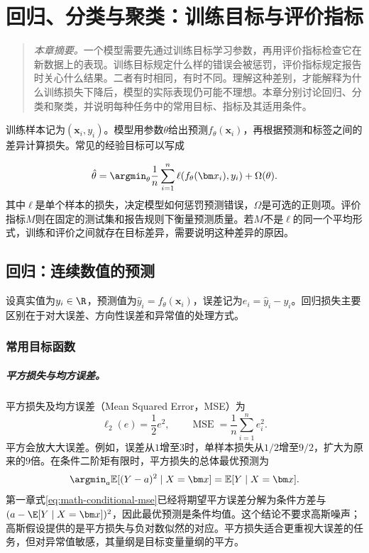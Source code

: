 \chapter{回归、分类与聚类：训练目标与评价指标}
\label{chap:objectives-metrics}
\begin{quote}\small
\textit{本章摘要。}一个模型需要先通过训练目标学习参数，再用评价指标检查它在新数据上的表现。训练目标规定什么样的错误会被惩罚，评价指标规定报告时关心什么结果。二者有时相同，有时不同。理解这种差别，才能解释为什么训练损失下降后，模型的实际表现仍可能不理想。本章分别讨论回归、分类和聚类，并说明每种任务中的常用目标、指标及其适用条件。
\end{quote}

训练样本记为$(\bm x_i,y_i)$。模型用参数$\theta$给出预测$f_\theta(\bm x_i)$，再根据预测和标签之间的差异计算损失。常见的经验目标可以写成

\begin{equation}
 \hat{\theta}=\argmin_{\theta}\frac1n\sum_{i=1}^n\ell(f_\theta(\bm x_i),y_i)+\Omega(\theta).
 \label{eq:pipeline-general-objective}
\end{equation}
其中$\ell$是单个样本的损失，决定模型如何惩罚预测错误，$\Omega$是可选的正则项。评价指标$M$则在固定的测试集和报告规则下衡量预测质量。若$M$不是$\ell$的同一个平均形式，训练和评价之间就存在目标差异，需要说明这种差异的原因。

\section{回归：连续数值的预测}
设真实值为$y_i\in\R$，预测值为$\hat y_i=f_\theta(\bm x_i)$，误差记为$e_i=\hat y_i-y_i$。回归损失主要区别在于对大误差、方向性误差和异常值的处理方式。

\subsection{常用目标函数}
\paragraph{平方损失与均方误差。}
平方损失及均方误差（Mean Squared Error，MSE）为
\begin{equation}
 \ell_2(e)=\frac12e^2,\qquad
 \operatorname{MSE}=\frac1n\sum_{i=1}^ne_i^2.
 \label{eq:regression-mse}
\end{equation}
平方会放大大误差。例如，误差从$1$增至$3$时，单样本损失从$1/2$增至$9/2$，扩大为原来的$9$倍。在条件二阶矩有限时，平方损失的总体最优预测为
\begin{equation}
 \argmin_a\mathbb E[(Y-a)^2\mid X=\bm x]=\mathbb E[Y\mid X=\bm x].
 \label{eq:regression-conditional-mean}
\end{equation}
第一章式\eqref{eq:math-conditional-mse}已经将期望平方误差分解为条件方差与$(a-\E[Y\mid X=\bm x])^2$，因此最优预测是条件均值。这个结论不要求高斯噪声；高斯假设提供的是平方损失与负对数似然的对应。平方损失适合更重视大误差的任务，但对异常值敏感，其量纲是目标变量量纲的平方。


